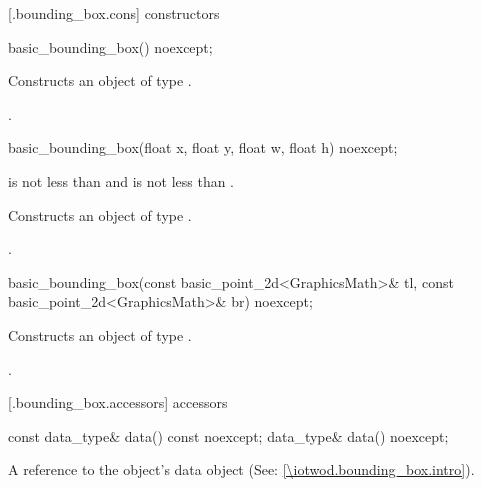  [\iotwod.bounding_box.cons] { constructors}

%
\begin{itemdecl}
basic_bounding_box() noexcept;
\end{itemdecl}
\begin{itemdescr}
\pnum
\effects
Constructs an object of type .

\pnum
\postconditions
{}.
\end{itemdescr}

%
\begin{itemdecl}
basic_bounding_box(float x, float y, float w, float h) noexcept;
\end{itemdecl}
\begin{itemdescr}
\pnum
\requires
{} is not less than  and  is not less than .

\pnum
\effects
Constructs an object of type .

\pnum
\postconditions
{}.
\end{itemdescr}

%
\begin{itemdecl}
basic_bounding_box(const basic_point_2d<GraphicsMath>& tl,
  const basic_point_2d<GraphicsMath>& br) noexcept;
\end{itemdecl}
\begin{itemdescr}
\pnum
\effects
Constructs an object of type .

\pnum
\postconditions
{}.
\end{itemdescr}

 [\iotwod.bounding_box.accessors]{ accessors}

%
\begin{itemdecl}
const data_type& data() const noexcept;
data_type& data() noexcept;
\end{itemdecl}
\begin{itemdescr}
\pnum
\returns
A reference to the  object's data object (See: \ref{\iotwod.bounding_box.intro}).
\end{itemdescr}

